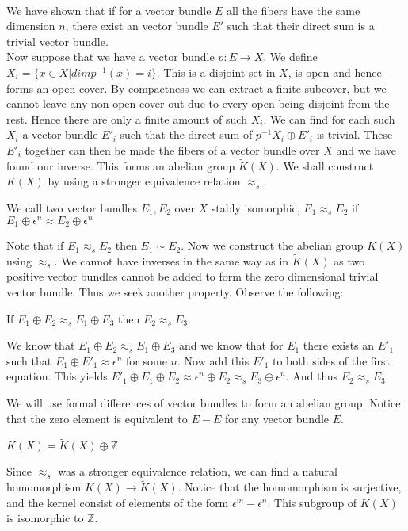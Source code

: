 \documentclass[../Thesis.tex]{subfiles}
\begin{document}
\\We have shown that if for a vector bundle $E$ all the fibers have the same dimension $n$, there exist an vector bundle $E'$ such that their direct sum is a trivial vector bundle.
\\Now suppose that we have a vector bundle $p: E \rightarrow X$. We define $X_i = \{ x \in X| dim p^{-1} (x) = i\}$. This is a disjoint set in $X$, is open and hence forms an open cover. By compactness we can extract a finite subcover, but we cannot leave any non open cover out due to every open being disjoint from the rest. Hence there are only a finite amount of such $X_i$. We can find for each such $X_i$ a vector bundle $E'_i$ such that the direct sum of $p^{-1} X_i \oplus E'_i$ is trivial. These $E'_i$ together can then be made the fibers of a vector bundle over $X$ and we have found our inverse. This forms an abelian group $\tilde{K}(X)$. We shall construct $K(X)$ by using a stronger equivalence relation $\approx_s$.
\begin{mydef}
We call two vector bundles $E_1, E_2$ over $X$ stably isomorphic, $E_1 \approx_s E_2$ if $E_1 \oplus \epsilon^n \approx E_2 \oplus \epsilon ^n$
\end{mydef}
Note that if $E_1 \approx_s E_2$ then $E_1 \sim E_2$. Now we construct the abelian group $K(X)$ using $\approx_s$. We cannot have inverses in the same way as in $\tilde{K}(X)$ as two positive vector bundles cannot be added to form the zero dimensional trivial vector bundle. Thus we seek another property. Observe the following: 
\begin{lemma}
If $E_1 \oplus E_2 \approx_s E_1 \oplus E_3$ then $E_2 \approx_s E_3$.
\end{lemma}
\begin{myproof}
We know that $E_1 \oplus E_2 \approx_s E_1 \oplus E_3$ and we know that for $E_1$ there exists an $E'_1$ such that $E_1 \oplus E'_1 \approx \epsilon^n$ for some $n$. Now add this $E'_1$ to both sides of the first equation. This yields
$E'_1 \oplus E_1 \oplus E_2 \approx \epsilon^n \oplus E_2 \approx_s E_3 \oplus \epsilon ^n$. And thus $E_2 \approx_s E_3$.
\end{myproof}
We will use formal differences of vector bundles to form an abelian group. Notice that the zero element is equivalent to $E-E$ for any vector bundle $E$. 
\begin{theorem}
$K(X) = \tilde{K}(X) \oplus \mathbb{Z}$
\end{theorem}
\begin{myproof}
Since $\approx_s$ was a stronger equivalence relation, we can find a natural homomorphism $K(X) \rightarrow \tilde{K}(X)$. Notice that the homomorphism is surjective, and the kernel consist of elements of the form $\epsilon^m - \epsilon^n$. This subgroup of $K(X)$ is isomorphic to $\mathbb{Z}$. 
\end{myproof}
\end{document}
